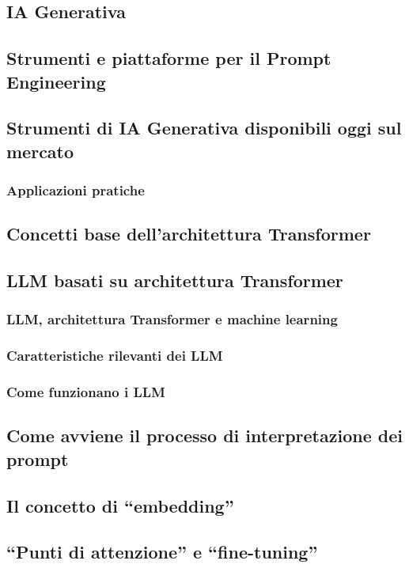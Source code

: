     \subsection{IA Generativa}

    \subsection{Strumenti e piattaforme per il Prompt Engineering}
    \subsection{Strumenti di IA Generativa disponibili oggi sul mercato}
        \subsubsection{Applicazioni pratiche}
    \subsection{Concetti base dell’architettura Transformer}
    \subsection{LLM basati su architettura Transformer}
        \subsubsection{LLM, architettura Transformer e machine learning}
        \subsubsection{Caratteristiche rilevanti dei LLM}
        \subsubsection{Come funzionano i LLM}
    \subsection{Come avviene il processo di interpretazione dei prompt}
    \subsection{Il concetto di ``embedding''}
    \subsection{``Punti di attenzione'' e ``fine-tuning''}
